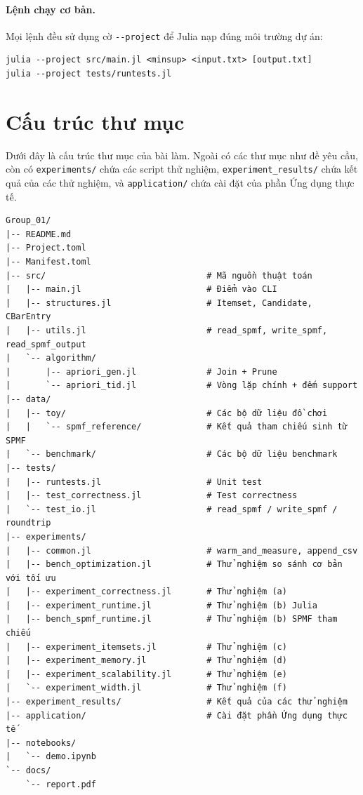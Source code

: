 \paragraph{Lệnh chạy cơ bản.} Mọi lệnh đều sử dụng cờ \texttt{-{}-project} để Julia nạp đúng môi trường dự án:
\begin{verbatim}
julia --project src/main.jl <minsup> <input.txt> [output.txt]
julia --project tests/runtests.jl
\end{verbatim}

\section{Cấu trúc thư mục}
\label{sec:impl-structure}

Dưới đây là cấu trúc thư mục của bài làm. Ngoài có các thư mục như đề yêu cầu, còn có \texttt{experiments/} chứa các script thử nghiệm, \texttt{experiment\_results/} chứa kết quả của các thử nghiệm, và \texttt{application/} chứa cài đặt của phần Ứng dụng thực tế.

\begin{verbatim}
Group_01/
|-- README.md
|-- Project.toml
|-- Manifest.toml
|-- src/                                # Mã nguồn thuật toán
|   |-- main.jl                         # Điểm vào CLI
|   |-- structures.jl                   # Itemset, Candidate, CBarEntry
|   |-- utils.jl                        # read_spmf, write_spmf, read_spmf_output
|   `-- algorithm/
|       |-- apriori_gen.jl              # Join + Prune
|       `-- apriori_tid.jl              # Vòng lặp chính + đếm support
|-- data/
|   |-- toy/                            # Các bộ dữ liệu đồ chơi
|   |   `-- spmf_reference/             # Kết quả tham chiếu sinh từ SPMF
|   `-- benchmark/                      # Các bộ dữ liệu benchmark
|-- tests/
|   |-- runtests.jl                     # Unit test
|   |-- test_correctness.jl             # Test correctness
|   `-- test_io.jl                      # read_spmf / write_spmf / roundtrip
|-- experiments/
|   |-- common.jl                       # warm_and_measure, append_csv
|   |-- bench_optimization.jl           # Thử nghiệm so sánh cơ bản với tối ưu
|   |-- experiment_correctness.jl       # Thử nghiệm (a)
|   |-- experiment_runtime.jl           # Thử nghiệm (b) Julia
|   |-- bench_spmf_runtime.jl           # Thử nghiệm (b) SPMF tham chiếu
|   |-- experiment_itemsets.jl          # Thử nghiệm (c)
|   |-- experiment_memory.jl            # Thử nghiệm (d)
|   |-- experiment_scalability.jl       # Thử nghiệm (e)
|   `-- experiment_width.jl             # Thử nghiệm (f)
|-- experiment_results/                 # Kết quả của các thử nghiệm
|-- application/                        # Cài đặt phần Ứng dụng thực tế
|-- notebooks/
|   `-- demo.ipynb
`-- docs/
    `-- report.pdf
\end{verbatim}

